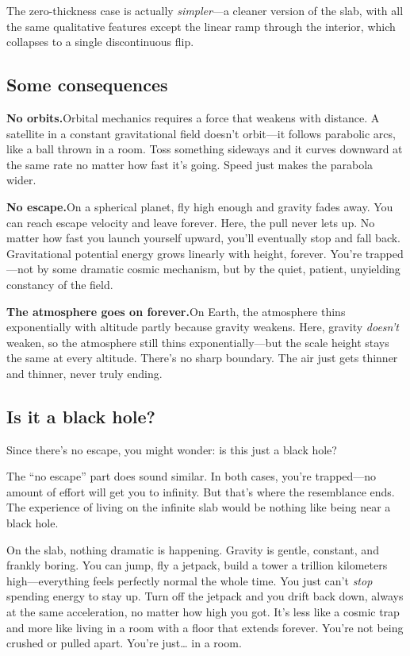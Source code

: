 \documentclass[11pt, letterpaper]{article}
\begin{document}
The zero-thickness case is actually \textit{simpler}---a cleaner version of the slab, with all the same qualitative features except the linear ramp through the interior, which collapses to a single discontinuous flip.

\subsection{Some consequences}

\textbf{No orbits.}\quad Orbital mechanics requires a force that weakens with distance. A satellite in a constant gravitational field doesn't orbit---it follows parabolic arcs, like a ball thrown in a room. Toss something sideways and it curves downward at the same rate no matter how fast it's going. Speed just makes the parabola wider.

\textbf{No escape.}\quad On a spherical planet, fly high enough and gravity fades away. You can reach escape velocity and leave forever. Here, the pull never lets up. No matter how fast you launch yourself upward, you'll eventually stop and fall back. Gravitational potential energy grows linearly with height, forever. You're trapped---not by some dramatic cosmic mechanism, but by the quiet, patient, unyielding constancy of the field.

\textbf{The atmosphere goes on forever.}\quad On Earth, the atmosphere thins exponentially with altitude partly because gravity weakens. Here, gravity \textit{doesn't} weaken, so the atmosphere still thins exponentially---but the scale height stays the same at every altitude. There's no sharp boundary. The air just gets thinner and thinner, never truly ending.

\subsection{Is it a black hole?}

Since there's no escape, you might wonder: is this just a black hole?

The ``no escape'' part does sound similar. In both cases, you're trapped---no amount of effort will get you to infinity. But that's where the resemblance ends. The experience of living on the infinite slab would be nothing like being near a black hole.

On the slab, nothing dramatic is happening. Gravity is gentle, constant, and frankly boring. You can jump, fly a jetpack, build a tower a trillion kilometers high---everything feels perfectly normal the whole time. You just can't \textit{stop} spending energy to stay up. Turn off the jetpack and you drift back down, always at the same acceleration, no matter how high you got. It's less like a cosmic trap and more like living in a room with a floor that extends forever. You're not being crushed or pulled apart. You're just\ldots{} in a room.
\end{document}
